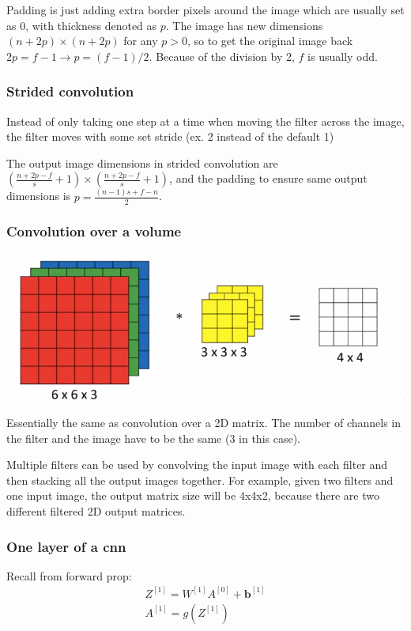 \documentclass[12pt]{article}
\begin{document}
Padding is just adding extra border pixels around the image which are usually
set as 0, with thickness denoted as $p$. The image has new dimensions $(n + 2p) \times
(n + 2p)$ for any $p > 0$, so to get the original image back $2p = f - 1 \rightarrow p = (f-1)/2$.
Because of the division by 2, $f$ is usually odd.

\subsubsection{Strided convolution}

Instead of only taking one step at a time when moving the filter across the image, the filter
moves with some set stride (ex. 2 instead of the default 1)

The output image dimensions in strided convolution are
$(\frac{n+2p-f}{s}+1) \times (\frac{n+2p-f}{s}+1)$, and the padding to ensure
same output dimensions is $p = \frac{(n-1)s+f-n}{2}$.

\subsubsection{Convolution over a volume}

\includegraphics[scale=.5]{images/cnn-filter-volume.png}

Essentially the same as convolution over a 2D matrix. The number of channels
in the filter and the image have to be the same (3 in this case).

Multiple filters can be used by convolving the input image with each filter and then stacking
all the output images together. For example, given two filters and one input image,
the output matrix size will be 4x4x2, because there are two different filtered 2D output
matrices.

\subsubsection{One layer of a cnn}

Recall from forward prop:
\begin{gather*}
    Z^{[1]} = W^{[1]} A^{[0]} + \bm b^{[1]}\\
    A^{[1]} = g(Z^{[1]})
\end{gather*}
\end{document}
